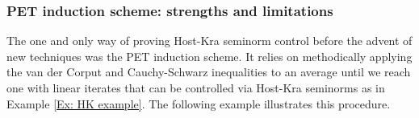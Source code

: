 \documentclass[11pt]{amsart}
\newtheorem{proposition}[lemma]{Proposition}
\theoremstyle{definition}
\DeclareMathOperator*{\E}{\mathbb{E}}
\newcommand{\N}{{\mathbb N}}
\newcommand{\CX}{{\mathcal X}}
\newcommand{\norm}[1]{\left\Vert #1\right\Vert}
\newcommand{\nnorm}[1]{\lvert\!|\!| #1|\!|\!\rvert}
\newcommand{\1}{{\mathbf{1}}}
\begin{document}
\subsubsection{PET induction scheme: strengths and limitations}\label{SSS: PET}
The one and only way of proving Host-Kra seminorm control before the advent of new techniques was the PET induction scheme. It relies on methodically applying the van der Corput and Cauchy-Schwarz inequalities to an average until we reach one with linear iterates that can be controlled via Host-Kra seminorms as in Example \ref{Ex: HK example}.
The following example illustrates this procedure.
\end{document}
